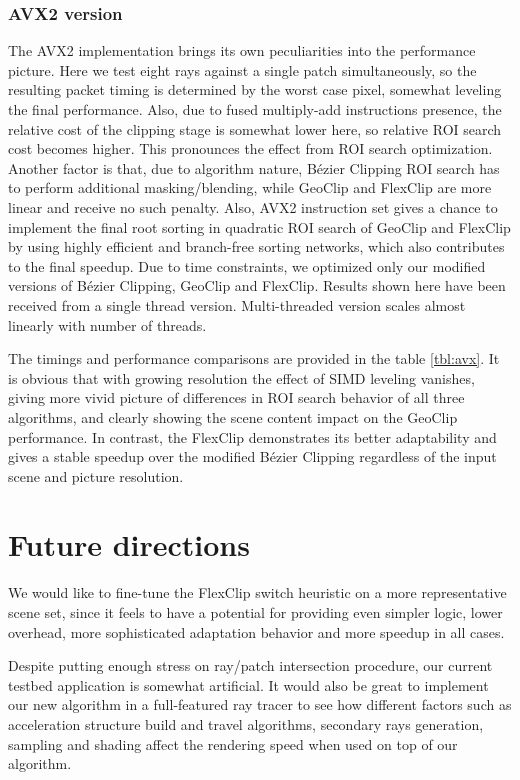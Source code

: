 \documentclass{jcgt}
\begin{document}
\subsubsection{AVX2 version}
The AVX2 implementation brings its own peculiarities into the performance picture. Here we test eight rays against a single patch simultaneously, so the resulting packet timing is determined by the worst case pixel, somewhat leveling the final performance. Also, due to fused multiply-add instructions presence, the relative cost of the clipping stage is somewhat lower here, so relative ROI search cost becomes higher. This pronounces the effect from ROI search  optimization. Another factor is that, due to algorithm nature, Bézier Clipping ROI search has to perform additional masking/blending, while GeoClip and FlexClip are more linear and receive no such penalty. Also, AVX2 instruction set gives a chance to implement the final root sorting in quadratic ROI search of GeoClip and FlexClip by using highly efficient and branch-free sorting networks, which also contributes to the final speedup.
Due to time constraints, we optimized only our modified versions of Bézier Clipping, GeoClip and FlexClip. Results shown here have been received from a single thread version. Multi-threaded version scales almost linearly with number of threads.

The timings and  performance comparisons are provided in the table \ref{tbl:avx}. It is obvious that with growing resolution the effect of SIMD leveling vanishes, giving more vivid picture of differences in ROI search behavior of all three algorithms, and clearly showing the scene content impact on the GeoClip performance. In contrast, the FlexClip demonstrates its better adaptability and gives a stable speedup over the modified Bézier Clipping regardless of the input scene and picture resolution.

\section{Future directions}
We would like to fine-tune the FlexClip switch heuristic on a more representative scene set, since it feels to have a potential for providing even simpler logic, lower overhead, more sophisticated adaptation behavior and more speedup in all cases.

Despite putting enough stress on ray/patch intersection procedure, our current testbed application is somewhat artificial. It would also be great to implement our new algorithm in a full-featured ray tracer to see how different factors such as acceleration structure build and travel algorithms, secondary rays generation, sampling and shading affect the rendering speed when used on top of our algorithm.
\end{document}
